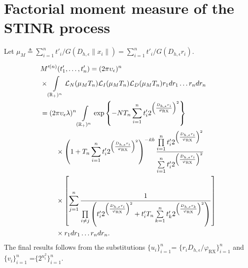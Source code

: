 \documentclass[lettersize,journal]{IEEEtran}
\newcommand{\R}{\mathbb{R}}
\begin{document}


\appendices

\section{Factorial moment measure of the STINR process}
\label{app:factorialmomentmeasureoftheSTINR}
Let $\mu_M \triangleq \sum_{i=1}^nt'_i/G(D_{h,\epsilon}\|x_i\|)=\sum_{i=1}^nt'_i/G(D_{h,\epsilon} r_i)$.

\begin{align}
  &M'^{(n)}(t'_1,\dots,t'_n) =(2 \pi \upsilon_{\epsilon})^n\nonumber\\
  & \times\int\limits_{(\R_+)^n} \mathcal{L}_N(\mu_MT_n)\mathcal{L}_I(\mu_MT_n)\mathcal{L}_D(\mu_MT_n) r_1 dr_1 \dots r_n dr_n\nonumber \\
  &=(2 \pi \upsilon_{\epsilon} \lambda)^n \int\limits_{(\R_+)^n} \exp\left\{-NT_n\sum\limits_{i=1}^nt'_i2^{\left(\frac{D_{h,\epsilon}r_i}{\varphi_{\text{RX}}}\right)^2}\right\} \nonumber\\
  &\hspace{0.8cm}\times\left(1+T_n\sum\limits_{i=1}^nt'_i2^{\left(\frac{D_{h,\epsilon}r_i}{\varphi_{\text{RX}}}\right)^2}\right)^{- \tilde{\kappa}b} \frac{\prod\limits_{i=1}^nt'_i2^{\left(\frac{D_{h,\epsilon}r_i}{\varphi_{\text{RX}}}\right)^2}}{\sum\limits_{i=1}^nt'_i2^{\left(\frac{D_{h,\epsilon}r_i}{\varphi_{\text{RX}}}\right)^2}} \nonumber\\
  &\hspace{0.8cm}\times  \left[\sum\limits_{j=1}^n\frac{1}{\prod\limits_{i\neq j}\left(t'_i 2^{\left(\frac{D_{h,\epsilon}r_i}{\varphi_{\text{RX}}}\right)^2}+ t_i'T_n\sum\limits_{k=1}^nt'_k2^{\left(\frac{D_{h,\epsilon}r_k}{\varphi_{\text{RX}}}\right)^2} \right)} \right] \nonumber\\
  &\hspace{0.8cm}\times r_1 dr_1 \dots r_n dr_n.
\end{align}
The final results follows from the substitutions $\{u_i\}_{i= 1}^n$= $\{r_i D_{h,\epsilon}/\varphi_{\text{RX}}\}_{i= 1}^n$ and $\{v_i\}_{i= 1}^n$ =$\{ 2^{u^2_i}\}_{i= 1}^n$.
\end{document}
